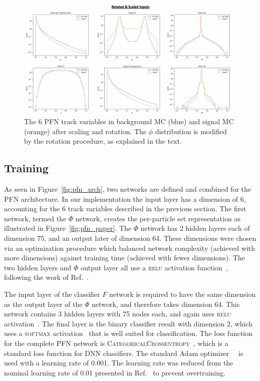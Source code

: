 \begin{figure}[!htbp]
    \centering
    \includegraphics[width=0.99\textwidth]{figures/ml/pfn_bkgsig_input_rot}
     \caption{The 6 PFN track variables in background MC (blue) and signal MC (orange) after scaling and rotation. The $\phi$ distribution is modified by the rotation procedure, as explained in the text.}
     \label{fig:pfn_bkgsig_input_rot}
\end{figure}

\clearpage

\subsection{Training}
\label{sec:pfn_training}

As seen in Figure~\ref{fig:pfn_arch}, two networks are defined and combined for the PFN architecture. In our implementation the input layer has a dimension of 6, accounting for the 6 track variables described in the previous section. The first network, termed the $\Phi$ network, creates the per-particle set representation as illustrated in Figure~\ref{fig:pfn_paper}. The $\Phi$ network has 2 hidden layers each of dimension 75, and an output later of dimension 64. These dimensions were chosen via an optimization procedure which balanced network complexity (achieved with more dimensions) against training time (achieved with fewer dimensions). The two hidden layers and $\Phi$ output layer all use a \textsc{relu} activation function~\cite{scikit-learn}, following the work of Ref.~\cite{pfn}. 

The input layer of the classifier $F$ network is required to have the same dimension as the output layer of the $\Phi$ network, and therefore takes dimension 64. This network contains 3 hidden layers with 75 nodes each, and again uses \textsc{relu} activation~\cite{scikit-learn}. The final layer is the binary classifier result with dimension 2, which uses a \textsc{softmax} activation~\cite{scikit-learn} that is well suited for classification. The loss function for the complete PFN network is \textsc{CategoricalCrossentropy}~\cite{scikit-learn}, which is a standard loss function for DNN classifiers. The standard Adam optimizer~\cite{adam}~\cite{scikit-learn} is used with a learning rate of 0.001. The learning rate was reduced from the nominal learning rate of 0.01 presented in Ref.~\cite{pfn} to prevent overtraining.\par

